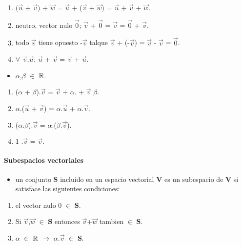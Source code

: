 \documentclass[a4paper]{article}
\begin{document}
\begin{enumerate}
	\item $(\vec{u}$ + $\vec{v})$ + $\vec{w}$  = $\vec{u}$ + ($\vec{v}$ + $\vec{w})$ = $\vec{u}$ + $\vec{v}$ + $\vec{w}$.
	\item neutro, vector nulo $\vec{0}$; $\vec{v}$ + $\vec{0}$ = $\vec{v}$ = $\vec{0}$ + $\vec{v}$.
	\item todo $\vec{v}$ tiene opuesto -$\vec{v}$ talque  $\vec{v}$ + (-$\vec{v}$) = $\vec{v}$ - $\vec{v}$ = $\vec{0}$.
	\item $\forall$ $\vec{v}$,$\vec{u}$;   $\vec{u}$ + $\vec{v}$ = $\vec{v}$ + $\vec{u}$.
\end{enumerate}
\begin{itemize}
	\item $\alpha$,$\beta$ $\in$ $\Bbb{R}$.
\end{itemize}
\begin{enumerate}
	\item ($\alpha$ + $\beta$).$\vec{v}$ = $\vec{v}$ + $\alpha$. + $\vec{v}$ $\beta$.
	\item $\alpha$.($\vec{u}$ + $\vec{v}$) = $\alpha$.$\vec{u}$ + $\alpha$.$\vec{v}$.
	\item ($\alpha$.$\beta$).$\vec{v}$ = $\alpha$.($\beta$.$\vec{v}$).
	\item 1 .$\vec{v}$ = $\vec{v}$.	  

\end{enumerate}
	

\paragraph{Subespacios vectoriales}
\begin{itemize}
	\item un conjunto $\textbf{S}$ incluido en un espacio vectorial $\textbf{V}$ es un subespacio de $\textbf{V}$ si satisface las siguientes condiciones:
\end{itemize}
\begin{enumerate}
	\item el vector nulo 0 $\in$ $\textbf{S}$.
	\item Si $\vec{v}$,$\vec{w}$ $\in$ $\textbf{S}$ entonces $\vec{v}$+$\vec{w}$ tambien $\in$ $\textbf{S}$.
	\item $\alpha$ $\in$ $\Bbb{R}$ $\longrightarrow$ $\alpha$.$\vec{v}$ $\in$ $\textbf{S}$. 
\end{enumerate}
\end{document}
